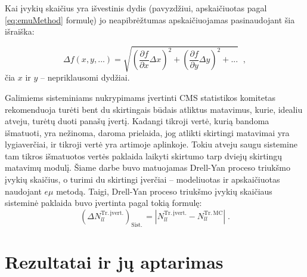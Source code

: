 \documentclass[a4paper, 12pt, twoside]{article}
\newcommand{\emu}{e\mu}
\newlength\q
\begin{document}
Kai įvykių skaičius yra išvestinis dydis (pavyzdžiui,  apskaičiuotas pagal \eqref{eq:emuMethod} formulę) jo neapibrėžtumas
 apskaičiuojamas pasinaudojant šia išraiška:

\begin{equation}
	\Delta f(x, y, ...) =
	\sqrt{ \left( \frac{\partial f}{\partial x} \Delta x \right)^{2} +
	\left( \frac{\partial f}{\partial y} \Delta y \right)^{2} + ... } \;\; \mathrm{,}
	\label{eq:DerUnc}
\end{equation}
čia $x$ ir $y$ -- nepriklausomi dydžiai.

Galimiems sisteminiams nukrypimams įvertinti CMS statistikos komitetas rekomenduoja turėti bent du skirtingais būdais
atliktus matavimus, kurie, idealiu atveju, turėtų duoti panašų įvertį.
Kadangi tikroji vertė, kurią bandoma išmatuoti, yra nežinoma, daroma prielaida, jog atlikti skirtingi matavimai yra
lygiaverčiai, ir tikroji vertė yra artimoje aplinkoje.
Tokiu atveju saugu sistemine tam tikros išmatuotos vertės paklaida laikyti skirtumo tarp dviejų skirtingų matavimų
modulį.
Šiame darbe buvo matuojamas Drell-Yan proceso triukšmo įvykių skaičius, o turimi du skirtingi įverčiai -- modeliuotas ir
apskaičiuotas naudojant $\emu$ metodą.
Taigi, Drell-Yan proceso triukšmo įvykių skaičiaus sisteminė paklaida buvo įvertinta pagal tokią formulę:
\begin{equation}
	(\Delta N_{ll}^{\mathrm{Tr. \, įvert.}})_{\mathrm{Sist.\,}} = | N_{ll}^{\mathrm{Tr. \, įvert.}} -
	N_{ll}^{\mathrm{Tr. \, MC}} | \; .
	\label{eq:systUnc}
\end{equation}

\vspace{-1cm}
\section{Rezultatai ir jų aptarimas}
\vspace{-0.2cm}
\end{document}
